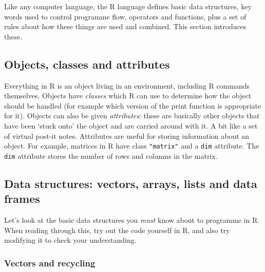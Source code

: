 \documentclass[10pt] {article}
\theoremstyle{definition}
\begin{document}
Like any computer language, the R language defines basic data structures, key words used to control programme flow, operators and functions, plus a set of rules about how these things are used and combined. This section introduces these. 

\subsection{Objects, classes and attributes}

Everything in R is an object living in an environment, including R commands themselves. Objects have {\em classes} which R can use to determine how the object should be handled (for example which version of the print function is appropriate for it).  Objects can also be given {\em attributes}: these are basically other objects that have been `stuck onto' the object and are carried around with it. A bit like a set of virtual post-it notes. Attributes are useful for storing information about an object.  For example, matrices in R have class \lstinline+"matrix"+ and a \lstinline+dim+ attribute. The \lstinline+dim+ attribute stores the number of rows and columns in the matrix.   

\subsection{Data structures: vectors, arrays, lists and data frames}  

Let's look at the basic data structures you {\em must} know about to programme in R. When reading through this, try out the code yourself in R, and also try modifying it to check your understanding. 

\subsubsection{Vectors and recycling}
\end{document}
